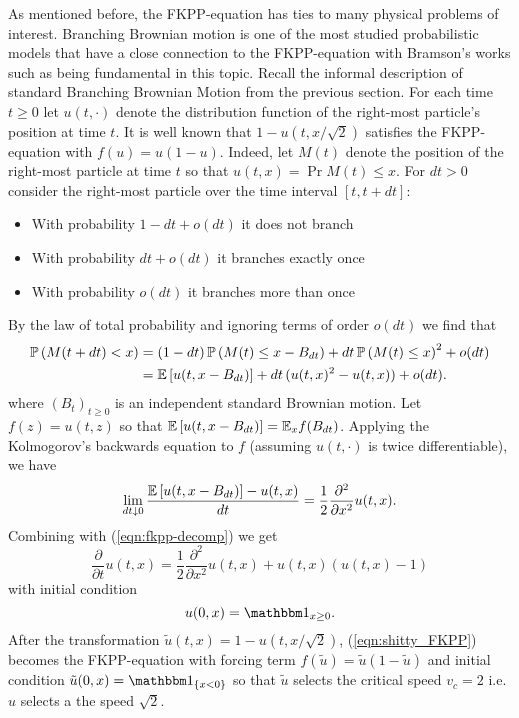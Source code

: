As mentioned before, the FKPP-equation has ties to many physical problems of interest. Branching Brownian motion is one of the most studied probabilistic models that have a close connection to the FKPP-equation with Bramson's works such as \cite{bramson1983convergence,bramson1978maximal} being fundamental in this topic. Recall the informal description of standard Branching Brownian Motion from the previous section. For each time $t \geq 0$ let $u(t, \cdot)$ denote the distribution function of the right-most particle's position at time $t$. It is well known that $1 - u(t, x/\sqrt{2})$ satisfies the FKPP-equation with $f(u) = u(1 - u)$. Indeed, let $M(t)$ denote the position of the right-most particle at time $t$ so that $u(t, x) = \Pr{M(t) \leq x}$. For $dt > 0$ consider the right-most particle over the time interval $[t, t+dt]$:
\begin{itemize}
\item \vspace{-2mm}With probability $1 - dt + o(dt)$ it does not branch
\item \vspace{-2mm}With probability $dt + o(dt)$ it branches exactly once
\item \vspace{-2mm}With probability $o(dt)$ it branches more than once
\end{itemize}	
By the law of total probability and ignoring terms of order $o(dt)$ we find that 
\begin{align}
\mathbb{P} \left( M(t + dt) < x \right) &= (1 - dt)\, \mathbb{P} \left( M(t) \leq x - B_{dt} \right) + dt\, \mathbb{P} \left( M(t) \leq x \right)^2 + o(dt)\nonumber \\
				   &= \mathbb{E}\left[ u(t, x - B_{dt}) \right] + dt\, (u(t,x)^2 - u(t,x)) + o(dt). \label{eqn:fkpp-decomp} 
\end{align}
where $(B_t)_{t \geq 0}$ is an independent standard Brownian motion. Let $f(z) = u(t, z)$ so that $\mathbb{E}\left[ u(t, x - B_{dt}) \right] = \mathbb{E}_x f(B_{dt})$. Applying the Kolmogorov's backwards equation to $f$ (assuming $u(t, \cdot)$ is twice differentiable), we have 
\begin{equation}\nonumber
\lim\limits_{dt \downarrow 0} \frac{\mathbb{E}\left[ u(t, x - B_{dt}) \right] - u(t, x)}{dt} = \frac{1}{2} \frac{\partial^2}{\partial x^2} u(t, x). 
\end{equation}
Combining with (\ref{eqn:fkpp-decomp}) we get 
\begin{equation}\label{eqn:shitty_FKPP}
\frac{\partial}{\partial t} u(t, x) = \frac{1}{2} \frac{\partial^2}{\partial x^2} u(t, x) + u(t, x)(u(t, x) - 1)
\end{equation}
with initial condition
\begin{equation}\nonumber
u(0, x) = \Ind_{x \geq 0}. 
\end{equation}
After the transformation $\tilde{u}(t, x) = 1 - u(t, x/\sqrt{2})$, (\ref{eqn:shitty_FKPP}) becomes the FKPP-equation with forcing term $f(\tilde{u}) = \tilde{u}(1 - \tilde{u})$ and initial condition $\tilde{u}(0, x) = \Ind_{\{ x < 0\}}$ so that $\tilde{u}$ selects the critical speed $v_c = 2$ i.e. $u$ selects a the speed $\sqrt{2}$. \\




